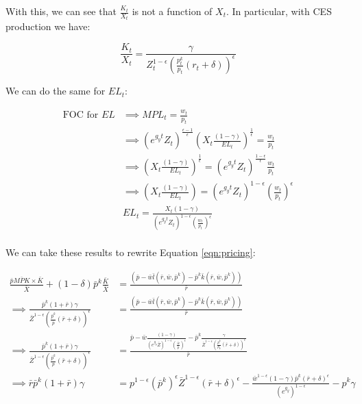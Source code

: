 \documentclass[letterpaper,12pt]{article}
\theoremstyle{definition}
\begin{document}
\begin{spacing}{1.5}
With this, we can see that $\frac{K_{t}}{X_{t}}$ is not a function of $X_{t}$. In particular, with CES production we have: 

\begin{equation}
\frac{K_{t}}{X_{t}} = \frac{\gamma}{Z_{t}^{1-\epsilon}\left(\frac{p^{k}_{t}}{p_{t}}(r_{t}+\delta)\right)^{\epsilon}}
\end{equation} 

We can do the same for $EL_{t}$:

\begin{equation}
\begin{split}
\text{FOC for $EL$}& \implies MPL_{t} = \frac{w_{t}}{p_{t}}\\
& \implies \left(e^{g_{y}t}Z_{t}\right)^{\frac{\epsilon-1}{\epsilon}}\left(X_{t}\frac{(1-\gamma)}{EL_{t}}\right)^{\frac{1}{\epsilon}} = \frac{w_{t}}{p_{t}} \\
& \implies \left(X_{t}\frac{(1-\gamma)}{EL_{t}}\right)^{\frac{1}{\epsilon}} =  \left(e^{g_{y}t}Z_{t}\right)^{\frac{1-\epsilon}{\epsilon}}\frac{w_{t}}{p_{t}} \\
& \implies \left(X_{t}\frac{(1-\gamma)}{EL_{t}}\right)=  \left(e^{g_{y}t}Z_{t}\right)^{1-\epsilon}\left(\frac{w_{t}}{p_{t}}\right)^{\epsilon} \\
& EL_{t}=  \frac{X_{t}(1-\gamma)}{\left(e^{g_{y}t}Z_{t}\right)^{1-\epsilon}\left(\frac{w_{t}}{p_{t}}\right)^{\epsilon}} \\
\end{split}
\end{equation}


We can take these results to rewrite Equation \ref{eqn:pricing}:

\begin{equation}
\label{eqn:pricing_final}
\begin{split}
 \frac{\bar{p}\overline{MPK} \times \bar{K}}{\bar{X}} + (1-\delta)\bar{p}^{k}\frac{\bar{K}}{\bar{X}} & =  \frac{\left(\bar{p} - \bar{w}\bar{l}(\bar{r},\bar{w},\bar{p}^{k}) - \bar{p}^{k}\bar{k}(\bar{r},\bar{w},\bar{p}^{k})\right)}{\bar{r}} \\
 \implies \frac{ \bar{p}^{k}(1+\bar{r})\gamma}{\bar{Z}^{1-\epsilon}\left(\frac{\bar{p}^{k}}{\bar{p}}(\bar{r}+\delta)\right)^{\epsilon}} & = \frac{\left(\bar{p} - \bar{w}\bar{l}(\bar{r},\bar{w},\bar{p}^{k}) - \bar{p}^{k}\bar{k}(\bar{r},\bar{w},\bar{p}^{k})\right)}{\bar{r}}  \\
  \implies \frac{ \bar{p}^{k}(1+\bar{r})\gamma}{\bar{Z}^{1-\epsilon}\left(\frac{\bar{p}^{k}}{\bar{p}}(\bar{r}+\delta)\right)^{\epsilon}} & = \frac{\bar{p} - \bar{w} \frac{(1-\gamma)}{\left(e^{g_{y}}\bar{Z}\right)^{1-\epsilon}\left(\frac{\bar{w}}{\bar{p}}\right)^{\epsilon}}  - \bar{p}^{k}\frac{\gamma}{\bar{Z}^{1-\epsilon}\left(\frac{\bar{p}^{k}}{p_{k}}(\bar{r}+\delta)\right)^{\epsilon}}}{\bar{r}} \\
  \implies \bar{r}\bar{p}^{k}(1+\bar{r})\gamma & = p^{1-\epsilon}\left(\bar{p}^{k}\right)^{\epsilon}\bar{Z}^{1-\epsilon}(\bar{r}+\delta)^{\epsilon} - \frac{\bar{w}^{1-\epsilon}(1-\gamma)\bar{p}^{k}(\bar{r}+\delta)^{\epsilon}}{\left(e^{g_{y}}\right)^{1-\epsilon}} - p^{k}\gamma
  \end{split}
\end{equation} 


\end{spacing}
\end{document}
